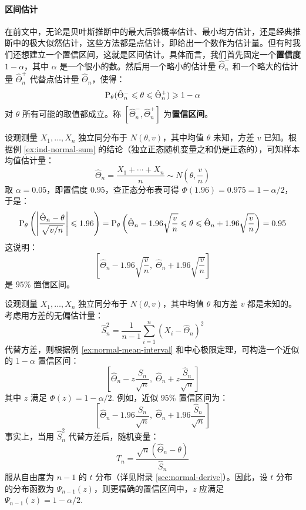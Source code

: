 \paragraph{区间估计}
在前文中，无论是贝叶斯推断中的最大后验概率估计、最小均方估计，还是经典推断中的极大似然估计，这些方法都是点估计，即给出一个数作为估计量。但有时我们还想建立一个置信区间，这就是区间估计。具体而言，我们首先固定一个\textbf{置信度} $1-\alpha$，其中 $\alpha$ 是一个很小的数。然后用一个略小的估计量 $\hat\Theta_n^-$ 和一个略大的估计量 $\hat\Theta_n^+$ 代替点估计量 $\hat\Theta_n$，使得：
\[
\mathrm{P}_\theta(\hat\Theta_n^-\leqslant\theta\leqslant\hat\Theta_n^+)\geqslant1-\alpha
\]
对 $\theta$ 所有可能的取值都成立。称 $[\hat\Theta_n^-,\hat\Theta_n^+]$ 为\textbf{置信区间}。

\begin{example}[正态随机变量公共均值的区间估计]
\label{ex:normal-mean-interval}
设观测量 $X_1,\ldots,X_n$ 独立同分布于 $N(\theta,v)$，其中均值 $\theta$ 未知，方差 $v$ 已知。根据例 \ref{ex:ind-normal-sum} 的结论（独立正态随机变量之和仍是正态的），可知样本均值估计量：
\[
\hat\Theta_n=\frac{X_1+\cdots+X_n}{n}\sim N\left(\theta,\frac{v}{n}\right)
\]
取 $\alpha=0.05$，即置信度 $0.95$，查正态分布表可得 $\Phi(1.96)=0.975=1-\alpha/2$，于是：
\[
\mathrm{P}_\theta\left(\left|\frac{\hat\Theta_n-\theta}{\sqrt{v/n}}\right|\leqslant1.96\right)=\mathrm{P}_\theta\left(\hat\Theta_n-1.96\sqrt{\frac{v}{n}}\leqslant\theta\leqslant \hat\Theta_n+1.96\sqrt{\frac{v}{n}}\right)=0.95
\]
这说明：
\[
\left[\hat\Theta_n-1.96\sqrt{\frac{v}{n}},\;\hat\Theta_n+1.96\sqrt{\frac{v}{n}}\right]
\]
是 $95\%$ 置信区间。
\end{example}

\begin{example}[基于方差近似估计量的区间估计]
设观测量 $X_1,\ldots,X_n$ 独立同分布于 $N(\theta,v)$，其中均值 $\theta$ 和方差 $v$ 都是未知的。考虑用方差的无偏估计量：
\[
\hat S_n^2=\frac{1}{n-1}\sum_{i=1}^n(X_i-\hat\Theta_n)^2
\]
代替方差，则根据例 \ref{ex:normal-mean-interval} 和中心极限定理，可构造一个近似的 $1-\alpha$ 置信区间：
\[
\left[\hat\Theta_n-z\frac{\hat S_n}{\sqrt{n}},\;\hat\Theta_n+z\frac{\hat S_n}{\sqrt{n}}\right]
\]
其中 $z$ 满足 $\Phi(z)=1-\alpha/2$. 例如，近似 $95\%$ 置信区间为：
\[
\left[\hat\Theta_n-1.96\frac{\hat S_n}{\sqrt{n}},\;\hat\Theta_n+1.96\frac{\hat S_n}{\sqrt{n}}\right]
\]
事实上，当用 $\hat S_n^2$ 代替方差后，随机变量：
\[
T_n=\frac{\sqrt{n}(\hat\Theta_n-\theta)}{\hat S_n}
\]
服从自由度为 $n-1$ 的 $t$ 分布（详见附录 \ref{sec:normal-derive}）。因此，设 $t$ 分布的分布函数为 $\Psi_{n-1}(z)$，则更精确的置信区间中，$z$ 应满足 $\Psi_{n-1}(z)=1-\alpha/2$. 
\end{example}

